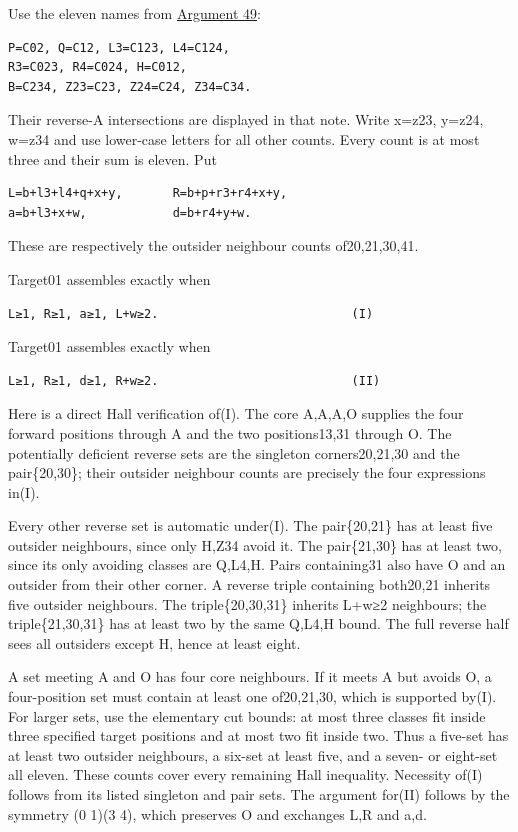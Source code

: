 \documentclass[
  10pt,
]{article}
\begin{document}
Use the eleven names from \protect\hyperlink{arg-49}{Argument 49}:

\begin{verbatim}
P=C02, Q=C12, L3=C123, L4=C124,
R3=C023, R4=C024, H=C012,
B=C234, Z23=C23, Z24=C24, Z34=C34.
\end{verbatim}

Their reverse-A intersections are displayed in that note. Write x=z23,
y=z24, w=z34 and use lower-case letters for all other counts. Every
count is at most three and their sum is eleven. Put

\begin{verbatim}
L=b+l3+l4+q+x+y,       R=b+p+r3+r4+x+y,
a=b+l3+x+w,            d=b+r4+y+w.
\end{verbatim}

These are respectively the outsider neighbour counts of20,21,30,41.

Target01 assembles exactly when

\begin{verbatim}
L≥1, R≥1, a≥1, L+w≥2.                           (I)
\end{verbatim}

Target01 assembles exactly when

\begin{verbatim}
L≥1, R≥1, d≥1, R+w≥2.                           (II)
\end{verbatim}

Here is a direct Hall verification of(I). The core A,A,A,O supplies the
four forward positions through A and the two positions13,31 through O.
The potentially deficient reverse sets are the singleton corners20,21,30
and the pair\{20,30\}; their outsider neighbour counts are precisely the
four expressions in(I).

Every other reverse set is automatic under(I). The pair\{20,21\} has at
least five outsider neighbours, since only H,Z34 avoid it. The
pair\{21,30\} has at least two, since its only avoiding classes are
Q,L4,H. Pairs containing31 also have O and an outsider from their other
corner. A reverse triple containing both20,21 inherits five outsider
neighbours. The triple\{20,30,31\} inherits L+w≥2 neighbours; the
triple\{21,30,31\} has at least two by the same Q,L4,H bound. The full
reverse half sees all outsiders except H, hence at least eight.

A set meeting A and O has four core neighbours. If it meets A but avoids
O, a four-position set must contain at least one of20,21,30, which is
supported by(I). For larger sets, use the elementary cut bounds: at most
three classes fit inside three specified target positions and at most
two fit inside two. Thus a five-set has at least two outsider
neighbours, a six-set at least five, and a seven- or eight-set all
eleven. These counts cover every remaining Hall inequality. Necessity
of(I) follows from its listed singleton and pair sets. The argument
for(II) follows by the symmetry (0 1)(3 4), which preserves O and
exchanges L,R and a,d.
\end{document}

